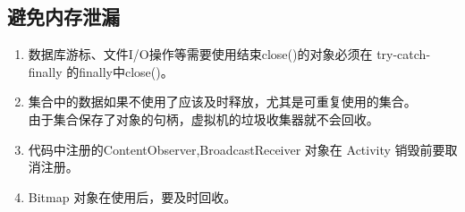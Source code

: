 \documentclass[a4paper,12pt]{article}
\begin{document}
\subsection{避免内存泄漏}
\begin{enumerate}
    \item 数据库游标、文件I/O操作等需要使用结束close()的对象必须在
        try-catch-finally 的finally中close()。
    \item 集合中的数据如果不使用了应该及时释放，尤其是可重复使用的集合。
        \\由于集合保存了对象的句柄，虚拟机的垃圾收集器就不会回收。 
    \item 代码中注册的ContentObserver,BroadcastReceiver 对象在 
        Activity 销毁前要取消注册。
    \item Bitmap 对象在使用后，要及时回收。
\end{enumerate}
\end{document}
